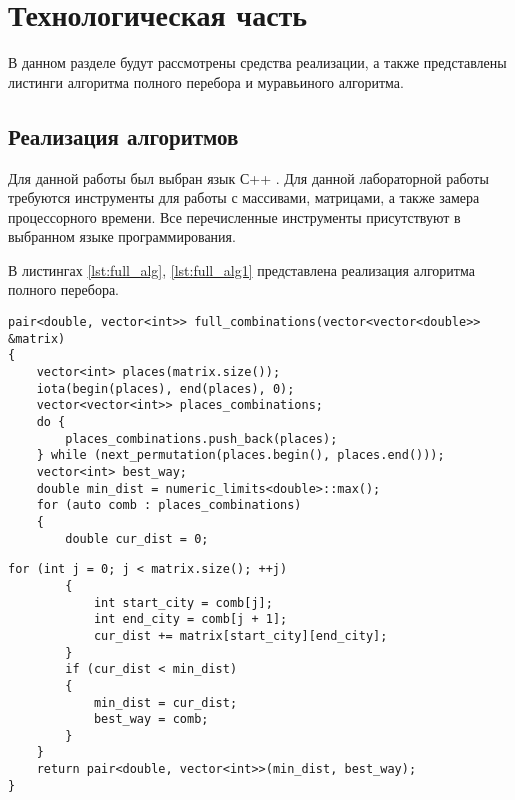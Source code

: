 \chapter{Технологическая часть}
В данном разделе будут рассмотрены средства реализации, а также представлены листинги алгоритма полного перебора и муравьиного алгоритма.

\section{Реализация алгоритмов}
Для данной работы был выбран язык С++ \cite{cpp}. Для данной лабораторной работы требуются инструменты для работы с массивами, матрицами, а также замера процессорного времени. Все перечисленные инструменты присутствуют в выбранном языке программирования.

В листингах \ref{lst:full_alg}, \ref{lst:full_alg1} представлена реализация алгоритма полного перебора.

\begin{center}
	\begin{lstlisting}[label=lst:full_alg,caption=Алгоритм полного перебора (начало)]
pair<double, vector<int>> full_combinations(vector<vector<double>> &matrix)
{
	vector<int> places(matrix.size());
	iota(begin(places), end(places), 0);
	vector<vector<int>> places_combinations;
	do {
		places_combinations.push_back(places);
	} while (next_permutation(places.begin(), places.end()));
	vector<int> best_way;
	double min_dist = numeric_limits<double>::max();
	for (auto comb : places_combinations)
	{
		double cur_dist = 0;
			\end{lstlisting}
		\clearpage
	\begin{lstlisting}[label=lst:full_alg1,caption=Алгоритм полного перебора (окончание)]
		for (int j = 0; j < matrix.size(); ++j)
		{
			int start_city = comb[j];
			int end_city = comb[j + 1];
			cur_dist += matrix[start_city][end_city];
		}
		if (cur_dist < min_dist)
		{
			min_dist = cur_dist;
			best_way = comb;
		}
	}
	return pair<double, vector<int>>(min_dist, best_way);
}
	\end{lstlisting}
\end{center}


